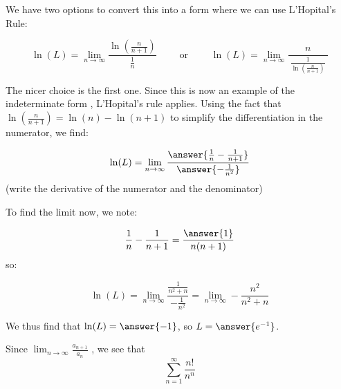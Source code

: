 \documentclass{ximera}
\begin{document}
\begin{exercise}
\begin{exercise}
\begin{hint}
We have two options to convert this into a form where we can use L'Hopital's Rule:


\[
\ln(L) =\lim_{n \to \infty}  \frac{\ln \left(\frac{n}{n+1} \right)}{\frac{1}{n}}  \qquad \textrm{ or } \qquad \ln(L)=\lim_{n \to \infty}  \frac{n}{~ \frac{1}{\ln \left(\frac{n}{n+1} \right) }~} 
\]

The nicer choice is the first one.  Since this is now an example of the indeterminate form  , L'Hopital's rule applies.  Using the fact that $\ln\left(\frac{n}{n+1}\right) = \ln(n) - \ln(n+1)$ to simplify the differentiation in the numerator, we find:

\[
\ln(L) = \lim_{n \to \infty}  \frac{\answer{\frac{1}{n} - \frac{1}{n+1}}}{\answer{-\frac{1}{n^2}}}
\]
(write the derivative of the numerator and the denominator)

\begin{question}
To find the limit now, we note:

\[
\frac{1}{n}-\frac{1}{n+1} = \frac{\answer{1}}{n(n+1)}
\]
so:

\[
\ln(L) = \lim_{n \to \infty}  \frac{\frac{1}{n^2+n}}{-\frac{1}{n^2}} =  \lim_{n \to \infty}  -\frac{n^2}{n^2+n}
\]

We thus find that $\ln(L) = \answer{-1}$, so $L=\answer{e^{-1}}$.

\end{question}
\end{hint}

\begin{exercise}

Since $\lim_{n \to \infty} \frac{a_{n+1}}{a_n}$ ,
we see that
\[
\sum^{\infty}_{n=1} \frac{n!}{n^n}
\]
\begin{multipleChoice}
\end{multipleChoice}

\end{exercise}
\end{exercise}
\end{exercise}
\end{document}

